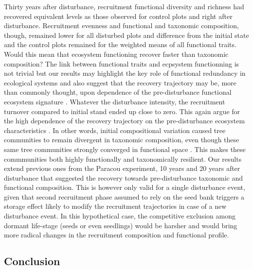 \documentclass[fleqn,10pt]{ArtEcoFoG} %
\begin{document}
Thirty years after disturbance, recruitment functional diversity and
richness had recovered equivalent levels as those observed for control
plots and right after disturbance. Recruitment evenness and functional
and taxonomic composition, though, remained lower for all disturbed
plots and difference from the initial state and the control plots
remained for the weighted means of all functional traits. Would this
mean that ecosystem functioning recover faster than taxonomic
composition? The link between functional traits and ecpsystem
functionning is not trivial but our results may highlight the key role
of functional redundancy in ecological systems and also suggest that the
recovery trajectory may be, more than commonly thought, upon dependence
of the pre-disturbance functional ecosystem signature
\citep{Herault2018}. Whatever the disturbance intensity, the recruitment
turnover compared to initial stand ended up close to zero. This again
argue for the high dependence of the recovery trajectory on the
pre-disturbance ecosystem characteristics \citep{Anderson2007}. In other
words, initial compositional variation caused tree communities to remain
divergent in taxonomic composition, even though these same tree
communities strongly converged in functional space \citep{Fukami2005}.
This makes these commmunities both highly functionally and taxonomically
resilient. Our results extend previous ones from the Paracou experiment,
10 years \citep{Molino2001} and 20 years \citep{Baraloto2012a} after
disturbance that suggested the recovery towards pre-disturbance
taxonomic and functional composition. This is however only valid for a
single disturbance event, given that second recruitment phase assumed to
rely on the seed bank triggers a storage effect likely to modify the
recruitment trajectories in case of a new disturbance event. In this
hypothetical case, the competitive exclusion among dormant life-stage
(seeds or even seedlings) would be harsher and would bring more radical
changes in the recruitment composition and functional profile.

\subsection{Conclusion}\label{conclusion}
\end{document}
